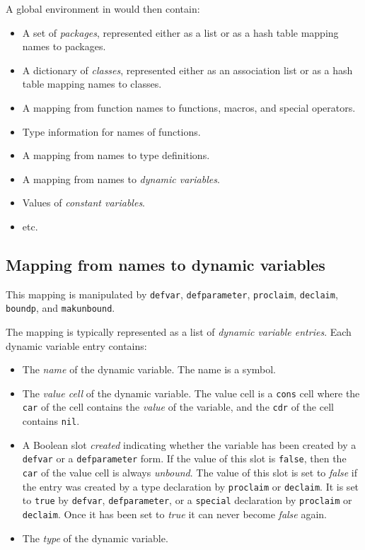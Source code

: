 A global environment in \sysname{} would then contain:

\begin{itemize}
\item A set of \emph{packages}, represented either as a list or as a
  hash table mapping names to packages.
\item A dictionary of \emph{classes}, represented either as an
  association list or as a hash table mapping names to classes.
\item A mapping from function names to functions, macros, and special
  operators.
\item Type information for names of functions.
\item A mapping from names to type definitions.
\item A mapping from names to \emph{dynamic variables}.
\item Values of \emph{constant variables}.
\item etc.
\end{itemize}

\subsection{Mapping from names to dynamic variables}

This mapping is manipulated by \texttt{defvar}, \texttt{defparameter},
\texttt{proclaim}, \texttt{declaim}, \texttt{boundp}, and
\texttt{makunbound}.

The mapping is typically represented as a list of \emph{dynamic
  variable entries}.  Each dynamic variable entry contains:

\begin{itemize}
\item The \emph{name} of the dynamic variable.  The name is a symbol. 
\item The \emph{value cell} of the dynamic variable.  The value cell
  is a \texttt{cons} cell where the \texttt{car} of the cell contains
  the \emph{value} of the variable, and the \texttt{cdr} of the cell
  contains \texttt{nil}. 
\item A Boolean slot \emph{created} indicating whether the variable
  has been created by a \texttt{defvar} or a \texttt{defparameter}
  form.  If the value of this slot is \texttt{false}, then the
  \texttt{car} of the value cell is always \emph{unbound}.  The value
  of this slot is set to \emph{false} if the entry was created by a
  type declaration by \texttt{proclaim} or \texttt{declaim}.  It is
  set to \texttt{true} by \texttt{defvar}, \texttt{defparameter}, or a
  \texttt{special} declaration by \texttt{proclaim} or
  \texttt{declaim}.  Once it has been set to \emph{true} it can never
  become \emph{false} again.
\item The \emph{type} of the dynamic variable.  
\end{itemize}

